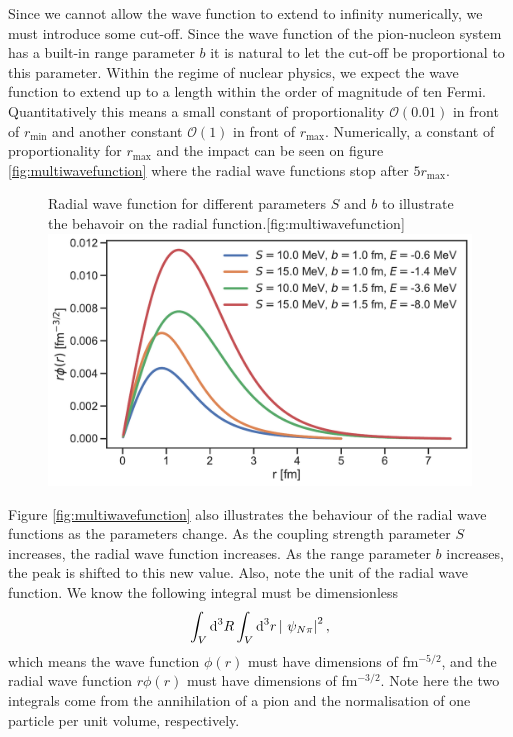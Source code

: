 Since we cannot allow the wave function to extend to infinity numerically, we must introduce some cut-off. Since the wave function of the pion-nucleon system has a built-in range parameter $b$ it is natural to let the cut-off be proportional to this parameter.
Within the regime of nuclear physics, we expect the wave function to extend up to a length within the order of magnitude of ten Fermi. Quantitatively this means a small constant of proportionality $\mathcal{O}(0.01)$ in front of $r_\text{min}$ and another constant $\mathcal{O}(1)$ in front of $r_{\text{max}}$. Numerically, a constant of proportionality for $r_{\text{max}}$ and the impact can be seen on figure \ref{fig:multiwavefunction} where the radial wave functions stop after $5r_\text{max}$.
\begin{figure}[H]
	\begin{sidecaption}{Radial wave function for different parameters $S$ and $b$ to illustrate the behavoir on the radial function.}[fig:multiwavefunction]
		\includegraphics[width=\linewidth]{Figures/multiwavefunction.pdf}
	\end{sidecaption}
\end{figure} 
Figure \ref{fig:multiwavefunction} also illustrates the behaviour of the radial wave functions as the parameters change. As the coupling strength parameter $S$ increases, the radial wave function increases. As the range parameter $b$ increases, the peak is shifted to this new value. Also, note the unit of the radial wave function. We know the following integral must be dimensionless 
\begin{equation} \label{volint}
	\int_V \text{d}^3R \int_V \text{d}^3r \, \abs{ \psi_{N\pi}}^2,
\end{equation}
which means the wave function $\phi(r)$ must have dimensions of fm$^{-5/2}$, and the radial wave function $r\phi(r)$ must have dimensions of fm$^{-3/2}$. Note here the two integrals come from the annihilation of a pion and the normalisation of one particle per unit volume, respectively.

